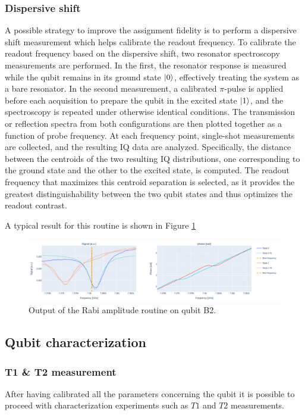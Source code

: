 \subsubsection{Dispersive shift}
A possible strategy to improve the assignment fidelity is to perform a dispersive shift measurement which helps calibrate the readout frequency.
To calibrate the readout frequency based on the dispersive shift, two resonator spectroscopy measurements are performed. 
In the first, the resonator response is measured while the qubit remains in its ground state $\ket{0}$, effectively treating the system as a bare resonator. 
In the second measurement, a calibrated $\pi$-pulse is applied before each acquisition to prepare the qubit in the excited state $\ket{1}$, and the spectroscopy is repeated under otherwise identical conditions. 
The transmission or reflection spectra from both configurations are then plotted together as a function of probe frequency. 
At each frequency point, single-shot measurements are collected, and the resulting IQ data are analyzed. 
Specifically, the distance between the centroids of the two resulting IQ distributions, one corresponding to the ground state and the other to the excited state, is computed. 
The readout frequency that maximizes this centroid separation is selected, as it provides the greatest distinguishability between the two qubit states and thus optimizes the readout contrast.

A typical result for this routine is shown in Figure \ref{fig:dispersive_shift}

\begin{figure}[h!]
    \centering
    \includegraphics[width=\textwidth]{figures/png/dispersive_shift.png}
    \caption{Output of the Rabi amplitude routine on qubit B2.}
    \label{fig:dispersive_shift}
\end{figure}

\subsection{Qubit characterization}
\subsubsection{T1 \& T2 measurement}
After having calibrated all the parameters concerning the qubit it is possible to proceed with characterization experiments such as $T1$ and $T2$ measurements.

